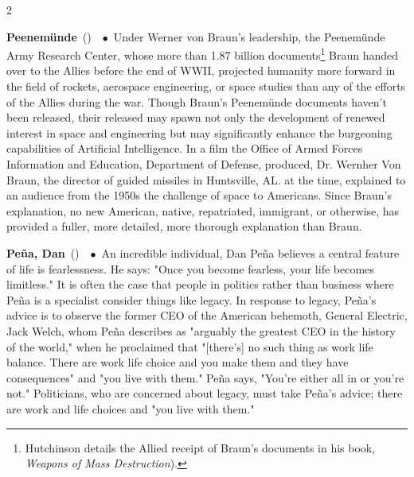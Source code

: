 \documentclass[10pt,a4paper,twoside]{article} %
\newcommand{\entry}[4]{\markboth{#1}{#1}\textbf{#1}\ {(#2)}\ \textit{#3}\ $\bullet$\ {#4}}  %
\begin{document}
\begin{multicols}{2}
\entry{\textgerman{Peenemünde}} {} {} {Under Werner von Braun's leadership, the \textgerman{Peenemünde} Army Research Center, whose more than 1.87 billion documents\footnote{Hutchinson details the Allied receipt of Braun's documents in his book, \emph{Weapons of Mass Destruction}).} Braun handed over to the Allies before the end of WWII, projected humanity more forward in the field of rockets, aerospace engineering, or space studies than any of the efforts of the Allies during the war. Though Braun's \textgerman{Peenemünde} documents haven't been released, their released may spawn not only the development of renewed interest in space and engineering but may significantly enhance the burgeoning capabilities of Artificial Intelligence. \newline \indent In a film the Office of Armed Forces Information and Education, Department of Defense, produced, Dr. Wernher Von Braun, the director of guided missiles in Huntsville, AL. at the time, explained to an audience from the 1950s the challenge of space to Americans. Since Braun's explanation, no new American, native, repatriated, immigrant, or otherwise, has provided a fuller, more detailed, more thorough explanation than Braun. } 

\entry{Peña, Dan} {} {} {An incredible individual, Dan Peña believes a central feature of life is fearlessness. He says: "Once you become fearless, your life becomes limitless." 
\indent \newline It is often the case that people in politics rather than business where Peña is a specialist consider things like legacy. In response to legacy, Peña's advice is to observe the former CEO of the American behemoth, General Electric, Jack Welch, whom Peña describes as "arguably the greatest CEO in the history of the world," when he proclaimed that "[there's] no such thing as work life balance. There are work life choice and you make them and they have consequences" and "you live with them." Peña says, "You're either all in or you're not."  Politicians, who are concerned about legacy, must take Peña's advice; there are work and life choices and "you live with them." }


\end{multicols}
\end{document}
